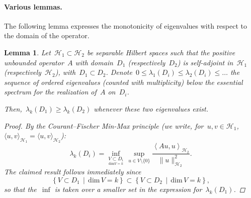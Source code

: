 \documentclass[10pt]{article}
\newcommand{\1}{\mathbbm 1}
\newtheorem{lemma}{Lemma}
\begin{document}
    \paragraph{Various lemmas.\newline}
    The following lemma expresses the monotonicity of eigenvalues with respect to the domain of the operator.
    \begin{lemma}
        \label{lemma:cf_monotonicity}
        Let~$\mathcal H_1 \subset \mathcal H_2$ be separable Hilbert spaces such that the positive unbounded operator~$A$ with domain~$D_1$ (respectively~$D_2$) is self-adjoint in~$\mathcal H_1$ (respectively~$\mathcal H_2$), with~$D_1\subset D_2$.
        Denote~$0 \leq \lambda_1(D_i) \leq \lambda_2(D_i)\leq \dots$ the sequence of ordered eigenvalues (counted with multiplicity) below the essential spectrum for the realization of~$A$ on~$D_i$.

        Then,~$\lambda_k(D_1) \geq \lambda_k(D_2)$ whenever these two eigenvalues exist.

        \begin{proof}
        By the Courant--Fischer Min-Max principle (we write, for~$u,v \in \mathcal H_1$,~$\langle u,v\rangle_{\mathcal H_1} = \langle u,v\rangle_{\mathcal H_2}$):
       ~$$\lambda_k(D_i) = \underset{\underset{\mathrm{dim} V = k}{V\subset D_i}}{\inf}\,\underset{u\in V\setminus\{0\}}{\sup} \frac{\left\langle Au,u\right\rangle_{\mathcal H_2}}{\|u\|^2_{\mathcal H_2}}.$$
        The claimed result follows immediately since
       ~$$\left\{ V\subset D_1\,\middle|\,\mathrm{dim}\,V = k\right\} \subset \left\{ V\subset D_2\,\middle|\,\mathrm{dim}\,V = k\right\},$$
        so that the~$\inf$ is taken over a smaller set in the expression for~$\lambda_k(D_1)$.
        \end{proof}
    \end{lemma}
\end{document}
